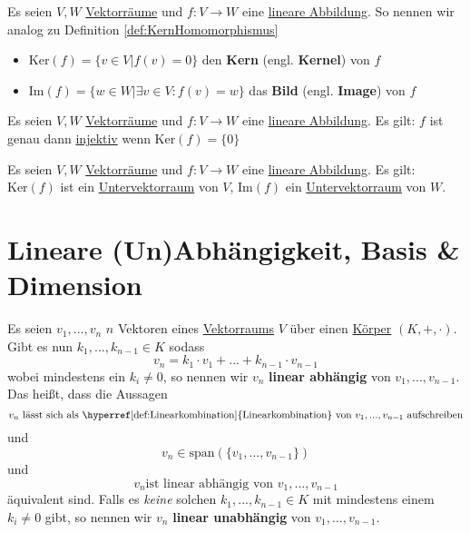 \documentclass[../../main.tex]{subfiles}
\begin{document}
	\begin{definition}
		\label{def:KernelLineareAbbildung}
		\label{def:KernLineareAbbildung}
		\label{def:ImageLineareAbbildung}
		\label{def:BildLineareAbbildung}
		Es seien $V, W$ \hyperref[def:Vektorraum]{Vektorräume} und $f: V \rightarrow W$ eine \hyperref[def:LineareAbbildung]{lineare Abbildung}. So nennen wir analog zu Definition \ref{def:KernHomomorphismus}
		\begin{itemize}
			\item $\textrm{Ker}(f) = \{ v \in V | f(v) = 0 \}$ den \textbf{Kern} (engl. \textbf{Kernel}) von $f$
			\item $\textrm{Im}(f) = \{ w \in W | \exists v \in V: f(v)=w \}$ das \textbf{Bild} (engl. \textbf{Image}) von $f$
		\end{itemize}
	\end{definition}
	
	\begin{theorem}
		Es seien $V, W$ \hyperref[def:Vektorraum]{Vektorräume} und $f: V \rightarrow W$ eine \hyperref[def:LineareAbbildung]{lineare Abbildung}. Es gilt: $f$ ist genau dann \hyperref[def:Injektiv]{injektiv} wenn $\textrm{Ker}(f)=\{0\}$
	\end{theorem}

	\begin{theorem}
		Es seien $V, W$ \hyperref[def:Vektorraum]{Vektorräume} und $f: V \rightarrow W$ eine \hyperref[def:LineareAbbildung]{lineare Abbildung}. Es gilt: $\textrm{Ker}(f)$ ist ein \hyperref[def:Untervektorraum]{Untervektorraum} von $V$, $\textrm{Im}(f)$ ein \hyperref[def:Untervektorraum]{Untervektorraum} von $W$. 
	\end{theorem}

	\section{Lineare (Un)Abhängigkeit, Basis \& Dimension}

	\begin{definition}
		\label{def:LineareAbhängigkeit}
		\label{def:LineareUnabhängigkeit}
		Es seien $v_1,...,v_n$ $n$ Vektoren eines \hyperref[def:Vektorraum]{Vektorraums} $V$ über einen \hyperref[def:Körper]{Körper} $(K,+,\cdot)$. Gibt es nun $k_1,...,k_{n-1} \in K$ sodass $$v_n = k_1 \cdot v_1 + ... + k_{n-1} \cdot v_{n-1}$$ wobei mindestens ein $k_i \not = 0$, so nennen wir $v_n$ \textbf{linear abhängig} von $v_1,...,v_{n-1}$. Das heißt, dass die Aussagen $$v_n \textrm{ lässt sich als \hyperref[def:Linearkombination]{Linearkombination} von } v_1,...,v_{n-1} \textrm{ aufschreiben}$$ und $$v_n \in \textrm{span}(\{v_1,...,v_{n-1}\})$$ und $$v_n \textrm{ist linear abhängig von } v_1,...,v_{n-1}$$ äquivalent sind. Falls es \textit{keine} solchen $k_1,...,k_{n-1} \in K$ mit mindestens einem $k_i \not = 0$ gibt, so nennen wir $v_n$ \textbf{linear unabhängig} von $v_1,...,v_{n-1}$.
	\end{definition}
\end{document}
